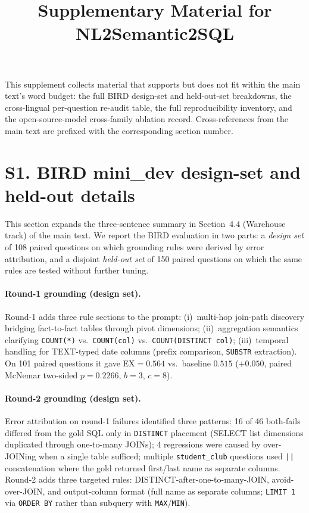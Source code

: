 \documentclass[11pt]{article}
\title{Supplementary Material for\\NL2Semantic2SQL}
\author{}
\date{}
\begin{document}
\maketitle

\noindent This supplement collects material that supports but does not fit within the main text's
word budget: the full BIRD design-set and held-out-set breakdowns, the cross-lingual
per-question re-audit table, the full reproducibility inventory, and the open-source-model
cross-family ablation record. Cross-references from the main text are prefixed with the
corresponding section number.

\section*{S1. BIRD mini\_dev design-set and held-out details}

This section expands the three-sentence summary in Section~4.4 (Warehouse track) of the
main text. We report the BIRD evaluation in two parts: a \emph{design set} of 108 paired
questions on which grounding rules were derived by error attribution, and a disjoint
\emph{held-out set} of 150 paired questions on which the same rules are tested without
further tuning.

\paragraph{Round-1 grounding (design set).} Round-1 adds three rule sections to the
prompt: (i)~multi-hop join-path discovery bridging fact-to-fact tables through pivot
dimensions; (ii)~aggregation semantics clarifying \texttt{COUNT(*)} vs.\ \texttt{COUNT(col)}
vs.\ \texttt{COUNT(DISTINCT col)}; (iii)~temporal handling for TEXT-typed date columns
(prefix comparison, \texttt{SUBSTR} extraction). On 101 paired questions it gave
EX$=0.564$ vs.\ baseline $0.515$ ($+0.050$, paired McNemar two-sided $p=0.2266$,
$b=3$, $c=8$).

\paragraph{Round-2 grounding (design set).} Error attribution on round-1 failures
identified three patterns: 16 of 46 both-fails differed from the gold SQL only in
\texttt{DISTINCT} placement (SELECT list dimensions duplicated through one-to-many
JOINs); 4 regressions were caused by over-JOINing when a single table sufficed;
multiple \texttt{student\_club} questions used \texttt{||} concatenation where the
gold returned first/last name as separate columns. Round-2 adds three targeted rules:
DISTINCT-after-one-to-many-JOIN, avoid-over-JOIN, and output-column format (full name
as separate columns; \texttt{LIMIT 1} via \texttt{ORDER BY} rather than subquery with
\texttt{MAX}/\texttt{MIN}).
\end{document}
